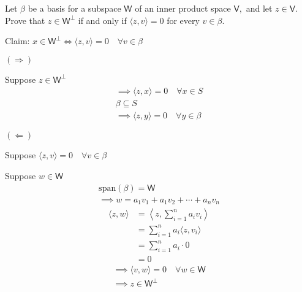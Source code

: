 Let $\beta$ be a basis for a subspace $\mathsf{W}$ of an inner product
space $\mathsf{V},$ and let $z \in \mathsf{V}.$ Prove that $z \in
\mathsf{W}^\perp$ if and only if $\langle z, v \rangle = 0$ for every
$v \in \beta.$

Claim: $x \in \mathsf{W}^\perp \Leftrightarrow \langle z,v \rangle = 0
\quad \forall v \in \beta$

$(\Rightarrow)$ 

Suppose $z \in \mathsf{W}^\perp$ 
\begin{gather}
\implies \langle z,x \rangle = 0 \quad \forall x \in S\\
\beta \subseteq S\\
\implies \langle z,y \rangle = 0 \quad \forall y \in \beta
\end{gather}

$(\Leftarrow)$

Suppose $\langle z,v\rangle =0 \quad \forall v \in \beta$

Suppose $w \in \mathsf{W}$
\begin{gather}
\text{span}(\beta) = \mathsf{W}\\
\implies w = a_1v_1 + a_1v_2 + \dotsb + a_nv_n
\end{gather}
\begin{align}
\langle z,w \rangle &= \left\langle z, \sum\limits_{i=1}^n a_iv_i\right\rangle \\
&= \sum\limits_{i=1}^n a_i \langle z,v_i\rangle\\
&= \sum\limits_{i=1}^n a_i \cdot 0\\
&= 0
\end{align}
\begin{gather}
\implies \langle v,w \rangle = 0 \quad \forall w \in \mathsf{W}\\
\implies z \in \mathsf{W}^\perp
\end{gather}
